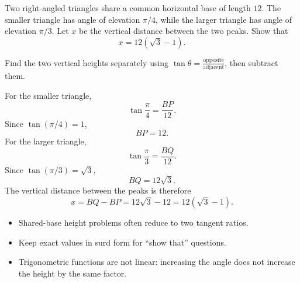 \begin{problem}
Two right-angled triangles share a common horizontal base of length $12$. The
smaller triangle has angle of elevation $\pi/4$, while the larger triangle has
angle of elevation $\pi/3$. Let $x$ be the vertical distance between the two
peaks. Show that
\[
x=12(\sqrt3-1).
\]

\begin{center}
\end{center}
\end{problem}

\begin{hintbox}
Find the two vertical heights separately using $\tan\theta=\frac{\text{opposite}}{\text{adjacent}}$,
then subtract them.
\end{hintbox}

\begin{solution}
For the smaller triangle,
\[
\tan\frac{\pi}{4}=\frac{BP}{12}.
\]
Since $\tan(\pi/4)=1$,
\[
BP=12.
\]
For the larger triangle,
\[
\tan\frac{\pi}{3}=\frac{BQ}{12}.
\]
Since $\tan(\pi/3)=\sqrt3$,
\[
BQ=12\sqrt3.
\]
The vertical distance between the peaks is therefore
\[
x=BQ-BP=12\sqrt3-12=12(\sqrt3-1).
\]
\end{solution}

\begin{takeaways}
\begin{itemize}[leftmargin=*]
  \item Shared-base height problems often reduce to two tangent ratios.
  \item Keep exact values in surd form for ``show that'' questions.
  \item Trigonometric functions are not linear: increasing the angle does not
        increase the height by the same factor.
\end{itemize}
\end{takeaways}

